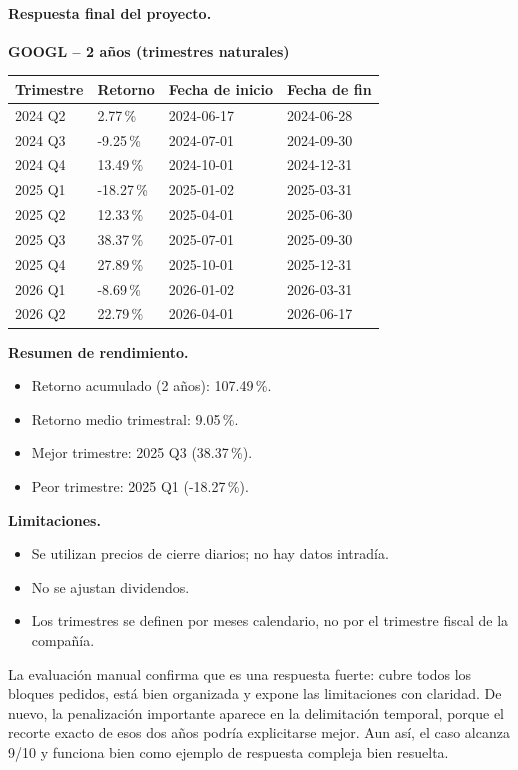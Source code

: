 \paragraph{Respuesta final del proyecto.}
{\small
\textbf{GOOGL -- 2 a\~nos (trimestres naturales)}

\begin{center}
\begin{tabular}{llll}
\toprule
Trimestre & Retorno & Fecha de inicio & Fecha de fin \\
\midrule
2024 Q2 & 2.77\,\% & 2024-06-17 & 2024-06-28 \\
2024 Q3 & -9.25\,\% & 2024-07-01 & 2024-09-30 \\
2024 Q4 & 13.49\,\% & 2024-10-01 & 2024-12-31 \\
2025 Q1 & -18.27\,\% & 2025-01-02 & 2025-03-31 \\
2025 Q2 & 12.33\,\% & 2025-04-01 & 2025-06-30 \\
2025 Q3 & 38.37\,\% & 2025-07-01 & 2025-09-30 \\
2025 Q4 & 27.89\,\% & 2025-10-01 & 2025-12-31 \\
2026 Q1 & -8.69\,\% & 2026-01-02 & 2026-03-31 \\
2026 Q2 & 22.79\,\% & 2026-04-01 & 2026-06-17 \\
\bottomrule
\end{tabular}
\end{center}

\textbf{Resumen de rendimiento.}
\begin{itemize}
\item Retorno acumulado (2 a\~nos): 107.49\,\%.
\item Retorno medio trimestral: 9.05\,\%.
\item Mejor trimestre: 2025 Q3 (38.37\,\%).
\item Peor trimestre: 2025 Q1 (-18.27\,\%).
\end{itemize}

\textbf{Limitaciones.}
\begin{itemize}
\item Se utilizan precios de cierre diarios; no hay datos intrad\'ia.
\item No se ajustan dividendos.
\item Los trimestres se definen por meses calendario, no por el trimestre fiscal de la compa\~n\'ia.
\end{itemize}
}

La evaluaci\'on manual confirma que es una respuesta fuerte: cubre todos los bloques pedidos, est\'a bien organizada y 
expone las limitaciones con claridad. De nuevo, la penalizaci\'on importante aparece en la delimitaci\'on temporal, porque 
el recorte exacto de esos dos a\~nos podr\'ia explicitarse mejor. Aun as\'i, el caso alcanza 9/10 y funciona bien como 
ejemplo de respuesta compleja bien resuelta.

